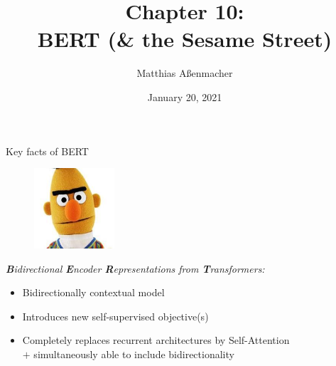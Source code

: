 \documentclass[]{beamer}
\title[BERT (\& the Sesame Street)]{Chapter 10: \\ BERT (\& the Sesame Street)}
\author{Matthias Aßenmacher}
\date{January 20, 2021}
\begin{document}
\begin{frame}
\titlepage
\end{frame}



\begin{frame}{Key facts of BERT \href{https://arxiv.org/pdf/1810.04805.pdf}{}}

\begin{figure}
\centering
\includegraphics[width = 3cm]{figure/bert.jpeg}
\end{figure}

\textit{\textbf{B}idirectional \textbf{E}ncoder \textbf{R}epresentations from \textbf{T}ransformers:}
\begin{itemize}
		\item Bidirectionally contextual model
		\item Introduces new self-supervised objective(s)
		\item Completely replaces recurrent architectures by Self-Attention\\$+$ simultaneously able to include bidirectionality
\end{itemize}
\end{frame}
\end{document}
